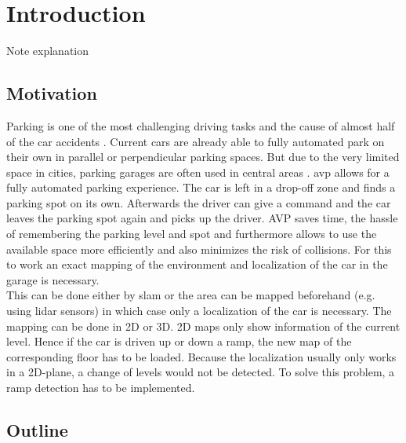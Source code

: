 \chapter{Introduction}
\label{ch:Introduction}
Note explanation

\section{Motivation}
Parking is one of the most challenging driving tasks and the cause of almost half of the car accidents \cite{accident}.
Current cars are already able to fully automated park on their own in parallel or perpendicular parking spaces.
But due to the very limited space in cities, parking garages are often used in central areas \cite{Banzhaf2017}.
\gls{avp} allows for a fully automated parking experience.
The car is left in a drop-off zone and finds a parking spot on its own.
Afterwards the driver can give a command and the car leaves the parking spot again and picks up the driver.
AVP saves time, the hassle of remembering the parking level and spot and furthermore allows to use the available space more efficiently and also minimizes the risk of collisions.
For this to work an exact mapping of the environment and localization of the car in the garage is necessary.\\
This can be done either by \gls{slam} or the area can be mapped beforehand (e.g. using \gls{lidar} sensors) in which case only a localization of the car is necessary.
The mapping can be done in 2D or 3D. 2D maps only show information of the current level. Hence if the car is driven up or down a ramp, the new map of the corresponding floor has to be loaded.
Because the localization usually only works in a 2D-plane, a change of levels would not be detected.
To solve this problem, a ramp detection has to be implemented.



\section{Outline}
